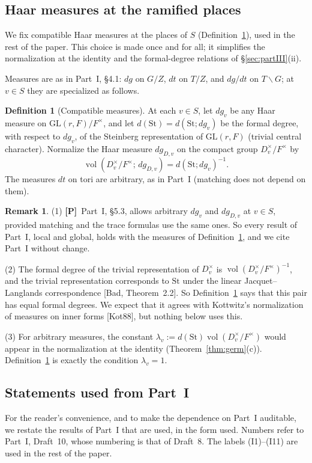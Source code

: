 \documentclass[12pt]{article}
\newcommand{\vol}{\operatorname{vol}}
\newcommand{\GL}{\mathrm{GL}}
\newcommand{\St}{\mathrm{St}}
\newcommand{\Pv}{\textbf{[P]}}
\theoremstyle{plain}
\theoremstyle{definition}
\newtheorem{definition}[theorem]{Definition}
\newtheorem{remark}[theorem]{Remark}
\begin{document}
\subsection{Haar measures at the ramified places}\label{subsec:measures}
We fix compatible Haar measures at the places of $S$ (Definition~\ref{def:measures}), used in the rest of the paper. This choice is made once and for all; it simplifies the normalization at the identity and the formal-degree relations of \S\ref{sec:partIII}(ii).

Measures are as in Part~I, \S4.1: $dg$ on $G/Z$, $dt$ on $T/Z$, and $dg/dt$ on $T\backslash G$; at $v\in S$ they are specialized as follows.

\begin{definition}[Compatible measures]\label{def:measures}
At each $v\in S$, let $dg_v$ be any Haar measure on $\GL(r,F)/F^\times$, and let $d(\St)=d(\St;dg_v)$ be the formal degree, with respect to $dg_v$, of the Steinberg representation of $\GL(r,F)$ (trivial central character). Normalize the Haar measure $dg_{D,v}$ on the compact group $D_v^\times/F^\times$ by
\[ \vol(D_v^\times/F^\times;\,dg_{D,v})=d(\St;dg_v)^{-1}. \]
The measures $dt$ on tori are arbitrary, as in Part~I (matching does not depend on them).
\end{definition}

\begin{remark}\label{rem:measures}
(1) \Pv\ Part~I, \S5.3, allows arbitrary $dg_v$ and $dg_{D,v}$ at $v\in S$, provided matching and the trace formulas use the same ones. So every result of Part~I, local and global, holds with the measures of Definition~\ref{def:measures}, and we cite Part~I without change.

(2) The formal degree of the trivial representation of $D_v^\times$ is $\vol(D_v^\times/F^\times)^{-1}$, and the trivial representation corresponds to $\St$ under the linear Jacquet--Langlands correspondence [Bad, Theorem~2.2]. So Definition~\ref{def:measures} says that this pair has equal formal degrees. We expect that it agrees with Kottwitz's normalization of measures on inner forms [Kot88], but nothing below uses this.

(3) For arbitrary measures, the constant $\lambda_v:=d(\St)\vol(D_v^\times/F^\times)$ would appear in the normalization at the identity (Theorem~\ref{thm:germ}(c)). Definition~\ref{def:measures} is exactly the condition $\lambda_v=1$.
\end{remark}

\subsection{Statements used from Part~I}\label{subsec:fromPartI}
For the reader's convenience, and to make the dependence on Part~I auditable, we restate the results of Part~I that are used, in the form used. Numbers refer to Part~I, Draft~10, whose numbering is that of Draft~8. The labels (I1)--(I11) are used in the rest of the paper.
\end{document}
